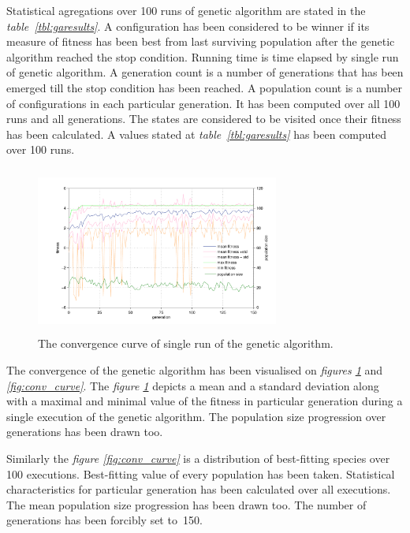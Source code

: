 \documentclass[a4paper]{IEEEtran}
\begin{document}
Statistical agregations over 100 runs of genetic algorithm are stated in the \textit{table~\ref{tbl:garesults}}.
A configuration has been considered to be winner if its measure of fitness has been best from last surviving population
after the genetic algorithm reached the stop condition. Running time is time elapsed by single run of genetic
algorithm. A generation count is a number of generations that has been emerged till the stop condition has been reached.
A population count is a number of configurations in each particular generation. It has been computed over 
all 100 runs and all generations.
The states are considered to be visited once their fitness has been calculated.
A values stated at \textit{table~\ref{tbl:garesults}} has been computed over 100 runs.

\begin{figure}[h]
	\centering
	\includegraphics[width=80mm,height=55mm]{ga_conv_curve_s}
	\caption{The convergence curve of single run of  the genetic algorithm.}
	\label{fig:conv_curve_s}
\end{figure}

The convergence of the genetic algorithm has been visualised
on \textit{figures \ref{fig:conv_curve_s}} and  \textit{\ref{fig:conv_curve}}.
The \textit{figure \ref{fig:conv_curve_s}} depicts a mean and a standard deviation 
along with a maximal and minimal value of the fitness
in particular generation during a single execution of the genetic algorithm.
The population size progression over generations has been drawn too.

Similarly the \textit{figure \ref{fig:conv_curve}} is a distribution of best-fitting species over 100 executions.
Best-fitting value of every population has been taken. Statistical characteristics for particular generation
has been calculated over all executions.
The mean population size progression has been drawn too. The number of generations has been forcibly set to~150.
\end{document}
